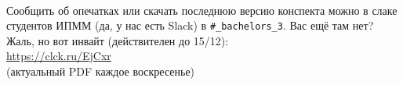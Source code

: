 \tableofcontents
{}
\vfill ~
\begin{center}
Сообщить об опечатках или скачать последнюю версию конспекта можно в слаке студентов ИПММ (да, у нас есть Slack) в \verb|#_bachelors_3|.
Вас ещё там нет? Жаль, но вот инвайт (действителен до 15/12): \\ \url{https://clck.ru/EjCxr}\\ 
(актуальный PDF каждое воскресенье) \\
\end{center}
